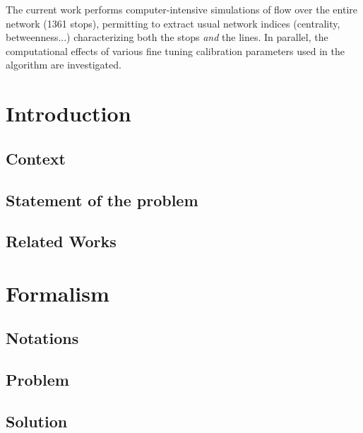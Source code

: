 \documentclass{bmcart}
\begin{document}
\vspace*{0.2cm}

The current work performs computer-intensive simulations of flow over the entire network (1361 stops), permitting to extract usual network indices (centrality, betweenness...) characterizing both the stops \emph{and} the lines. In parallel, the computational effects of various fine tuning calibration parameters used in the algorithm are investigated. 




 

\section{Introduction}

\subsection{Context}

\subsection{Statement of the problem}

\subsection{Related Works}


\section{Formalism}

\subsection{Notations}

\subsection{Problem}

\subsection{Solution}

\end{document}
